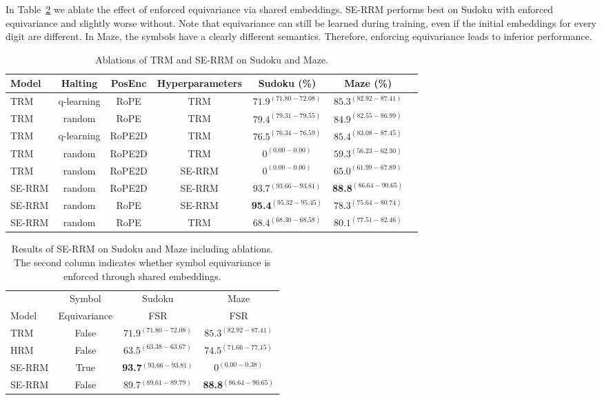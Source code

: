 \documentclass{article}
\theoremstyle{plain}
\theoremstyle{definition}
\theoremstyle{remark}
\begin{document}
In Table~\ref{tab:sudoku_maze} we ablate the effect of enforced equivariance via shared embeddings. SE-RRM performs best on Sudoku with enforced equivariance and slightly worse without. Note that equivariance can still be learned during training, even if the initial embeddings for every digit are different. In Maze, the symbols have a clearly different semantics. Therefore, enforcing equivariance leads to inferior performance.

\begin{table}[h]
\centering
\caption{Ablations of TRM and SE-RRM on Sudoku and Maze.}
\label{tab:ablations}
\begin{tabular}{lcccccc}
\toprule
Model & Halting & PosEnc & Hyperparameters & Sudoku (\%) & Maze (\%)\\
\midrule
TRM & q-learning & RoPE & TRM & $71.9^{(71.80-72.08)}$ &$85.3^{(82.92-87.41)}$ \\
TRM & random & RoPE & TRM & $79.4^{(79.31-79.55)}$ & $84.9^{(82.55-86.99)}$ \\
TRM & q-learning & RoPE2D & TRM & $76.5^{(76.34-76.59)}$ & $85.4^{(83.08-87.45)}$\\ 
TRM & random & RoPE2D & TRM & $0^{(0.00-0.00)}$ & $59.3^{(56.23-62.30)}$\\ 
TRM & random & RoPE2D & SE-RRM &  $0^{(0.00-0.00)}$ & $65.0^{(61.99-67.89)}$\\
SE-RRM & random & RoPE2D & SE-RRM & {93.7}$^{(93.66-93.81)}$ & \textbf{88.8}$^{(86.64-90.65)}$ \\
SE-RRM & random & RoPE & SE-RRM & \textbf{95.4}$^{(95.32-95.45)}$ & $78.3^{(75.64-80.74)}$ \\
SE-RRM & random & RoPE & TRM & $68.4^{(68.30-68.58)}$ &$80.1^{(77.51-82.46)}$\\ 
\bottomrule
\end{tabular}
\end{table}


\begin{table}[h]
\centering
\caption{Results of SE-RRM on Sudoku and Maze including ablations. The second column indicates whether symbol equivariance is enforced through shared embeddings.}
\label{tab:sudoku_maze}
\begin{tabular}{lccc}
\toprule
& Symbol & Sudoku & Maze \\
Model &  Equivariance & FSR &  FSR 
\\
\midrule
TRM & False & $71.9^{(71.80-72.08)}$ &  $85.3^{(82.92-87.41)}$ \\
HRM & False & $63.5^{(63.38-63.67)}$ & $74.5^{(71.66-77.15)}$ \\
SE-RRM & True &  \textbf{93.7}$^{(93.66-93.81)}$ &$0^{(0.00-0.38)}$\\
SE-RRM & False & {89.7}$^{(89.61-89.79)}$  & \textbf{88.8}$^{(86.64-90.65)}$ \\

\bottomrule
\end{tabular}
\end{table}
\end{document}

